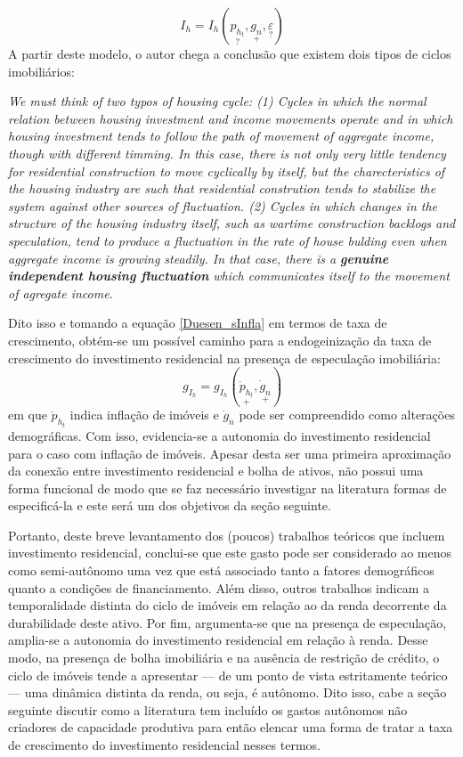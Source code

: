\begin{equation}
\label{Duesen_sInfla}
I_h = I_h(\underset{?}{p_{h_t}}, \underset{+}{g_n}, \underset{?}{\varepsilon})
\end{equation}
A partir deste modelo, o autor chega a conclusão que existem dois tipos de ciclos imobiliários:
\begin{citacao}
\textit{We must think of two typos of housing cycle: (1) Cycles in which the normal relation between housing investment and income movements operate and  in which housing investment tends to follow the path of movement of aggregate income, though with different timming.
In this case, there is not only very little tendency for residential construction to move cyclically by itself, but the charecteristics of the housing industry are such that residential constrution tends to  stabilize the system against other sources of fluctuation.
(2) Cycles in which changes in the structure of the housing industry itself, such as wartime construction backlogs and speculation, tend to produce a fluctuation in the rate of house bulding even when aggregate income is growing steadily. 
In that case, there is a \textbf{genuine independent housing fluctuation} which communicates itself to the movement of agregate income.}
\cite[p.~164. grifos adicionados]{duesenberry_investment_1958}
\end{citacao}
Dito isso e tomando a equação \ref{Duesen_sInfla} em termos de taxa de crescimento, obtém-se um possível caminho para a endogeinização da taxa de crescimento do investimento residencial na presença de especulação imobiliária:
\begin{equation}
g_{I_h} = g_{I_h}(\underset{+}{\dot p_{h_t}}, \underset{+}{\dot g_n})
\end{equation}
em que $\dot p_{h_t}$ indica inflação de imóveis e $\dot g_n$ pode ser compreendido como alterações demográficas.
Com isso, evidencia-se a autonomia do investimento residencial para o caso com inflação de imóveis.
Apesar desta ser uma primeira aproximação da conexão entre investimento residencial e bolha de ativos, não possui uma forma funcional de modo que se faz necessário investigar na literatura formas de especificá-la e este será um dos objetivos da seção seguinte.

Portanto, deste breve levantamento dos (poucos) trabalhos teóricos que incluem investimento residencial, conclui-se que este gasto pode ser considerado ao menos como semi-autônomo uma vez que está associado tanto a fatores demográficos quanto a condições de financiamento.
Além disso, outros trabalhos indicam a temporalidade distinta do ciclo de imóveis em relação ao da renda decorrente da durabilidade deste ativo.
Por fim, argumenta-se que na presença de especulação, amplia-se a autonomia do investimento residencial em relação à renda. 
Desse modo, na presença de bolha imobiliária e na ausência de restrição de crédito, o ciclo de imóveis tende a apresentar --- de um ponto de vista estritamente teórico --- uma dinâmica distinta da renda, ou seja, é autônomo.
Dito isso, cabe a seção seguinte discutir como a literatura tem incluído os gastos autônomos não criadores de capacidade produtiva para então elencar uma forma de tratar a taxa de crescimento do investimento residencial nesses termos.


